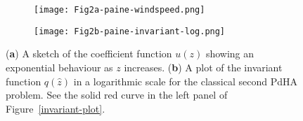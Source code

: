 \documentclass[symmetry,article,accept,moreauthors,pdftex,a4paper]{mdpi}
\begin{document}
\nointerlineskip
\begin{figure}[H]
\widefigure
\begin{subfigure}{0.45\textwidth}
\caption{} \vspace{0.1cm}
\texttt{[image: Fig2a-paine-windspeed.png]}
\end{subfigure}	\hspace*{0.5cm}
\begin{subfigure}{0.45\textwidth}
\caption{} \vspace{0.1cm}
\texttt{[image: Fig2b-paine-invariant-log.png]}
\end{subfigure}
\caption{(\textbf{a}) A sketch of the coefficient function $u(z)$ showing an exponential behaviour as $z$ increases. (\textbf{b}) A plot of the invariant function $q(\widehat{z})$ in a logarithmic scale for the classical second PdHA problem. See the solid red curve in the left panel of Figure~\ref{invariant-plot}.}		\label{compare-plot}
\end{figure}
\end{document}
